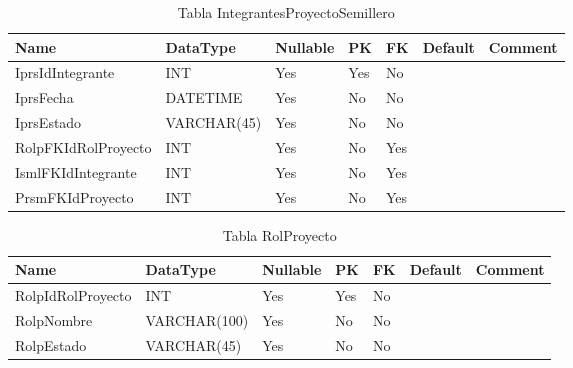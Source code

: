 \begin{table}
	\caption{Tabla IntegrantesProyectoSemillero}
	\label{labelTableIntegrantesProyectoSemillero}
	\begin{tabular}{ |l|l|l|l|l|l|l| }
		\hline
		Name & DataType & Nullable & PK & FK & Default & Comment \\ \hline
		IprsIdIntegrante & INT & Yes & Yes & No &  & \\ \hline 
		IprsFecha & DATETIME & Yes & No & No &  & \\ \hline 
		IprsEstado & VARCHAR(45) & Yes & No & No &  & \\ \hline 
		RolpFKIdRolProyecto & INT & Yes & No & Yes &  & \\ \hline 
		IsmlFKIdIntegrante & INT & Yes & No & Yes &  & \\ \hline 
		PrsmFKIdProyecto & INT & Yes & No & Yes &  & \\ \hline 
		
	\end{tabular}
\end{table}


\begin{table}
	\caption{Tabla RolProyecto}
	\label{labelTableRolProyecto}
	\begin{tabular}{ |l|l|l|l|l|l|l| }
		\hline
		Name & DataType & Nullable & PK & FK & Default & Comment \\ \hline
		RolpIdRolProyecto & INT & Yes & Yes & No &  & \\ \hline 
		RolpNombre & VARCHAR(100) & Yes & No & No &  & \\ \hline 
		RolpEstado & VARCHAR(45) & Yes & No & No &  & \\ \hline 
		
	\end{tabular}
\end{table}


